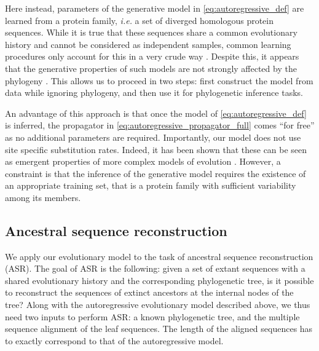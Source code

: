 Here instead, parameters of the generative model in \eqref{eq:autoregressive_def} are learned from a protein family, \emph{i.e.} a set of diverged homologous protein sequences. 
While it is true that these sequences share a common evolutionary history and cannot be considered as independent samples, common learning procedures only account for this in a very crude way \cite{cocco_inversestatisticalphysics_2018,trinquier_efficientgenerativemodeling_2021}.
Despite this, it appears that the generative properties of such models are not strongly affected by the phylogeny \cite{hockenberry_phylogeneticweightingdoes_2019,rodriguezhorta_effectphylogeneticcorrelations_2021}. 
This allows us to proceed in two steps: first construct the model from data while ignoring phylogeny, and then use it for phylogenetic inference tasks.

An advantage of this approach is that once the model of \eqref{eq:autoregressive_def} is inferred, the propagator in \eqref{eq:autoregressive_propagator_full} comes ``for free'' as no additional parameters are required. 
Importantly, our model does not use site specific substitution rates. 
Indeed, it has been shown that these can be seen as emergent properties of more complex models of evolution \cite{delapaz_epistaticcontributionspromote_2020}.
However, a constraint is that the inference of the generative model requires the existence of an appropriate training set, that is a protein family with sufficient variability among its members. 


\subsection{Ancestral sequence reconstruction}

We apply our evolutionary model to the task of ancestral sequence reconstruction (ASR). 
The goal of ASR is the following: given a set of extant sequences with a shared evolutionary history and the corresponding phylogenetic tree, is it possible to reconstruct the sequences of extinct ancestors at the internal nodes of the tree? 
Along with the autoregressive evolutionary model described above, we thus need two inputs to perform ASR: a known phylogenetic tree, and the multiple sequence alignment of the leaf sequences. 
The length of the aligned sequences has to exactly correspond to that of the autoregressive model. 

